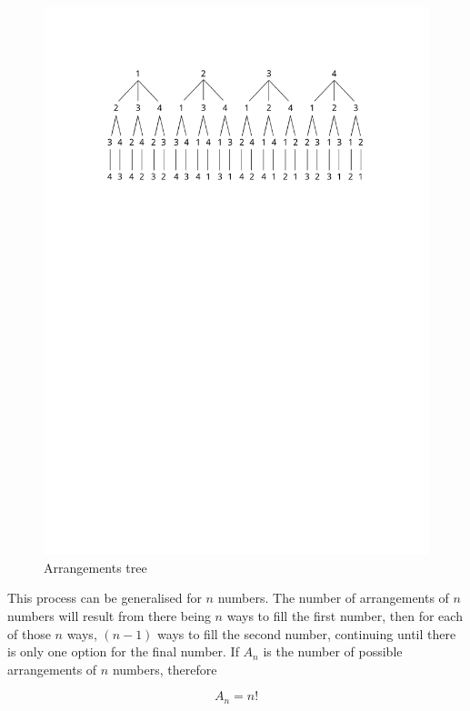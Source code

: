 \documentclass[a5paper]{article}
\begin{document}
\begin{figure}[ht]

  \begin{center}
    \includegraphics{arrangements}
  \end{center}
  \caption{Arrangements tree}
  \label{fig:1}
\end{figure}

This process can be generalised for $n$ numbers. The number of arrangements of
$n$ numbers will result from there being $n$ ways to fill the first number, then
for each of those $n$ ways, $(n-1)$ ways to fill the second number, continuing
until there is only one option for the final number. If $A_n$ is the number of
possible arrangements of $n$ numbers, therefore

\begin{equation} \label{eq:3}
  A_n = n!
\end{equation}
\end{document}
